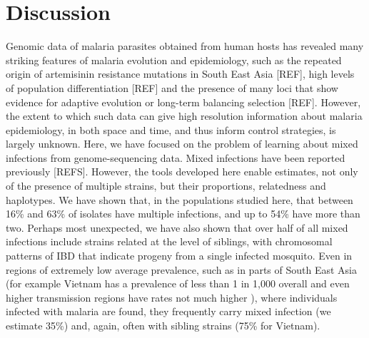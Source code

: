 \documentclass[9pt,lineno]{elife}
\begin{document}
\section{Discussion}

Genomic data of malaria parasites obtained from human hosts has revealed many striking features of malaria evolution and epidemiology, such as the repeated origin of artemisinin resistance mutations in South East Asia [REF], high levels of population differentiation [REF] and the presence of many loci that show evidence for adaptive evolution or long-term balancing selection [REF].  However, the extent to which such data can give high resolution information about malaria epidemiology, in both space and time, and thus inform control strategies, is largely unknown.  Here, we have focused on the problem of learning about mixed infections from genome-sequencing data.  Mixed infections have been reported previously [REFS].  However, the tools developed here enable estimates, not only of the presence of multiple strains, but their proportions, relatedness and haplotypes.  We have shown that, in the populations studied here, that between 16\% and 63\% of isolates have multiple infections, and up to 54\% have more than two.  Perhaps most unexpected, we have also shown that over half of all mixed infections include strains related at the level of siblings, with chromosomal patterns of IBD that indicate progeny from a single infected mosquito.  Even in regions of extremely low average prevalence, such as in parts of South East Asia (for example Vietnam has a prevalence of less than 1 in 1,000 overall and even higher transmission regions have rates not much higher \citep{who2017, who2017profile}), where individuals infected with malaria are found, they frequently carry mixed infection (we estimate 35\%) and, again, often with sibling strains (75\% for Vietnam).
\end{document}
